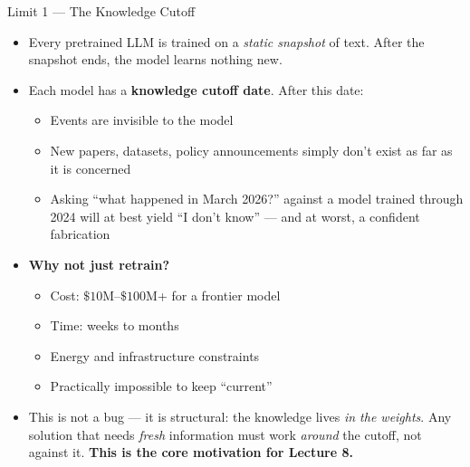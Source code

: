 \begin{frame}{Limit 1 --- The Knowledge Cutoff}
\begin{itemize}
\item Every pretrained LLM is trained on a \emph{static snapshot} of text. After the snapshot ends, the model learns nothing new.

\medskip
\item Each model has a \textbf{knowledge cutoff date}. After this date:
\begin{itemize}
    \item Events are invisible to the model
    \item New papers, datasets, policy announcements simply don't exist as far as it is concerned
    \item Asking ``what happened in March 2026?'' against a model trained through 2024 will at best yield ``I don't know'' --- and at worst, a confident fabrication
\end{itemize}

\medskip
\item \textbf{Why not just retrain?}
\begin{itemize}
    \item Cost: $\$10$M--$\$100$M+ for a frontier model
    \item Time: weeks to months
    \item Energy and infrastructure constraints
    \item Practically impossible to keep ``current''
\end{itemize}

\medskip
\item This is not a bug --- it is structural: the knowledge lives \emph{in the weights}. Any solution that needs \emph{fresh} information must work \emph{around} the cutoff, not against it. \textbf{This is the core motivation for Lecture 8.}
\end{itemize}
\end{frame}

